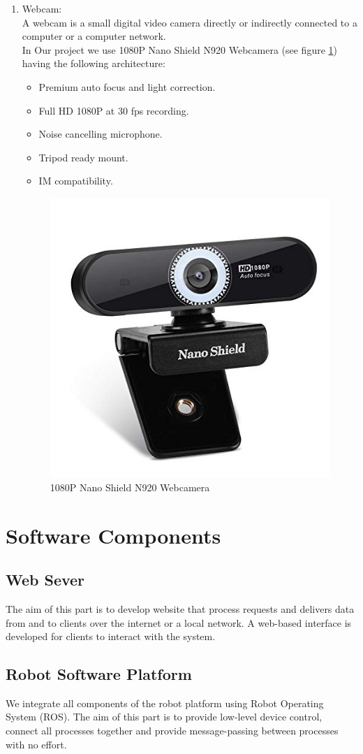 \begin{enumerate}
    \item Webcam: \\
  A webcam is a small digital video camera directly or indirectly connected to a computer or a computer network. \cite{web011}\\
   In Our project we use 1080P Nano Shield N920 Webcamera (see figure \ref{fig:nano_webcam}) having the following architecture:
   
   \begin{itemize}
        \item Premium auto focus and light correction.
        \item Full HD 1080P at 30 fps recording.
        \item Noise cancelling microphone.
        \item Tripod ready mount.
        \item IM compatibility. 
   \end{itemize}{}
   
   \begin{figure}[H]%
    \center%
    \includegraphics[width=.5\textwidth]
    {images/Alzahraa/webcamera_nano.jpg}%
    \caption[Camera Nano]{1080P Nano Shield N920 Webcamera}\label{fig:nano_webcam}%
  \end{figure}
   \end{enumerate}
   
   \section{Software Components}
\subsection{Web Sever}
\hspace{2cm}The aim of this part is to develop website that process requests and delivers data from and to clients over the internet or a local network. A web-based interface is developed for clients to interact with the system. 

\subsection{Robot Software Platform}
\hspace{2cm}We integrate all components of the robot platform using Robot Operating System (ROS). The aim of this part is to provide low-level device control, connect all processes together and provide message-passing between processes with no effort. 